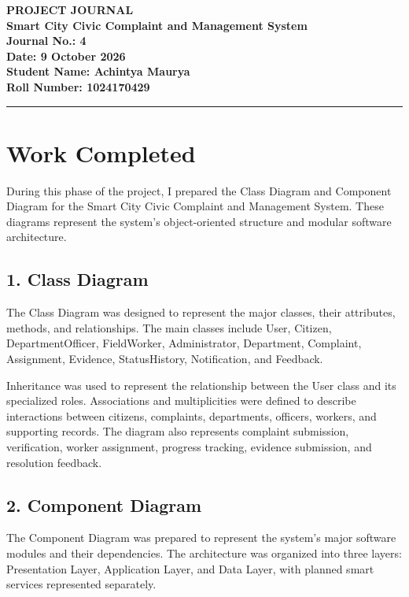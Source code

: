 \documentclass[12pt,a4paper]{article}
\begin{document}
\begin{center}
    {\Large \textbf{PROJECT JOURNAL}}\\[6pt]
    {\large \textbf{Smart City Civic Complaint and Management System}}\\[8pt]
    \textbf{Journal No.: 4}\\
    \textbf{Date: 9 October 2026}\\
    \textbf{Student Name: Achintya Maurya}\\
    \textbf{Roll Number: 1024170429}
\end{center}

\hrule
\vspace{8pt}

\section*{Work Completed}

During this phase of the project, I prepared the Class Diagram and Component Diagram for the Smart City Civic Complaint and Management System. These diagrams represent the system's object-oriented structure and modular software architecture.

\subsection*{1. Class Diagram}

The Class Diagram was designed to represent the major classes, their attributes, methods, and relationships. The main classes include User, Citizen, DepartmentOfficer, FieldWorker, Administrator, Department, Complaint, Assignment, Evidence, StatusHistory, Notification, and Feedback.

Inheritance was used to represent the relationship between the User class and its specialized roles. Associations and multiplicities were defined to describe interactions between citizens, complaints, departments, officers, workers, and supporting records. The diagram also represents complaint submission, verification, worker assignment, progress tracking, evidence submission, and resolution feedback.

\subsection*{2. Component Diagram}

The Component Diagram was prepared to represent the system's major software modules and their dependencies. The architecture was organized into three layers: Presentation Layer, Application Layer, and Data Layer, with planned smart services represented separately.
\end{document}
